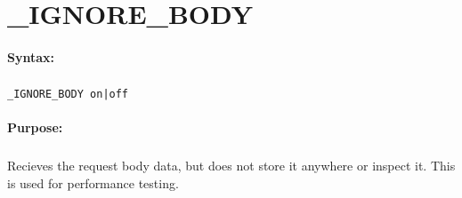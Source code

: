 
\newpage
\section{\_IGNORE\_BODY}
\label{cmd:_IGNORE_BODY}

\paragraph{Syntax:}
\subparagraph{}
\texttt{\_IGNORE\_BODY on|off}

\paragraph{Purpose:}
\subparagraph{}
Recieves the request body data, but does not store it anywhere 
or inspect it. This is used for performance testing.

